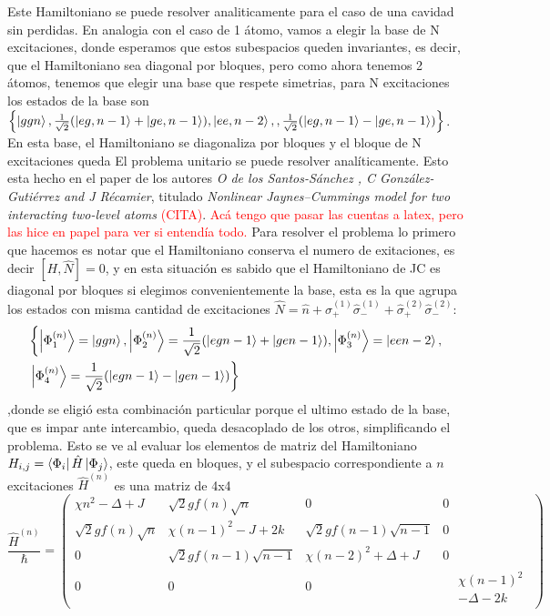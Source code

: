 Este Hamiltoniano se puede resolver analiticamente para el caso de una cavidad sin perdidas. En analogia con el caso de 1 átomo, vamos a elegir la base de N excitaciones, donde esperamos que estos subespacios queden invariantes, es decir, que el Hamiltoniano sea diagonal por bloques, pero como ahora tenemos 2 átomos, tenemos que elegir una base que respete simetrias, para N excitaciones los estados de la base son $\left\{\ket{ggn},\frac{1}{\sqrt{2}}(\ket{eg,n-1}+\ket{ge,n-1}),\ket{ee,n-2},,\frac{1}{\sqrt{2}}(\ket{eg,n-1}-\ket{ge,n-1})\right\}$. En esta base, el Hamiltoniano se diagonaliza por bloques y el bloque de N excitaciones queda
El problema unitario se puede resolver analíticamente. Esto esta hecho en el paper de los autores \textit{O de los Santos-Sánchez
, C González-Gutiérrez and J Récamier}, titulado \textit{Nonlinear Jaynes–Cummings model for two
interacting two-level atoms} \cite{paper:santos}\textcolor{red}{(CITA)}. 
\textcolor{red}{Ac\'a tengo que pasar las cuentas a latex, pero las hice en papel para ver si entend\'ia todo.}
Para resolver el problema lo primero que hacemos es notar que el Hamiltoniano conserva el numero de exitaciones, es decir $[H,\hat N]=0$, y en esta situación es sabido que el Hamiltoniano de JC es diagonal por bloques si elegimos convenientemente la base, esta es la que agrupa los estados con misma cantidad de excitaciones $\hat N = \hat n + \hat \sigma_+^{(1)}\hat \sigma_-^{(1)}+\hat \sigma_+^{(2)}\hat \sigma_-^{(2)}$: 
\begin{equation}
\begin{split}
    & \left\{\ket{\Phi^{(n)}_1}=\ket{ggn},\ket{\Phi^{(n)}_2}=\frac{1}{\sqrt{2}}(\ket{egn-1}+\ket{gen-1}),\ket{\Phi^{(n)}_3}=\ket{een-2},\right. \\
& \left. \ket{\Phi^{(n)}_4}=\frac{1}{\sqrt{2}}(\ket{egn-1}-\ket{gen-1})\right\} 
\end{split}
\label{ec4:base}
\end{equation}
,donde se eligi\'o esta combinaci\'on particular porque el ultimo estado de la base, que es impar ante intercambio, queda desacoplado de los otros, simplificando el problema. Esto se ve al evaluar los elementos de matriz del Hamiltoniano $H_{i,j}=\bra{\Phi_i}\hat H \ket{\Phi_j}$, este queda en bloques, y el subespacio correspondiente a $n$ excitaciones $\hat H^{(n)}$ es una matriz de 4x4
\begin{equation}
    \frac{\hat H^{(n)}}{\hbar}=
    \begin{pmatrix}
     \chi n^2 - \Delta +  J & \sqrt{2} g f(n)\sqrt{n} & 0 & 0 \\
    \sqrt{2} g f(n)\sqrt{n} &  \chi (n-1)^2  -  J + 2 k & \sqrt{2} g f(n-1)\sqrt{n-1} & 0 \\
    0 & \sqrt{2} g f(n-1)\sqrt{n-1} &  \chi (n-2)^2 +  \Delta +  J & 0 \\
    0&0&0& \begin{aligned} 
                 & \chi (n-1)^2  \\ 
                 &-  \Delta - 2 k
        \end{aligned}
    \end{pmatrix}
\end{equation}

